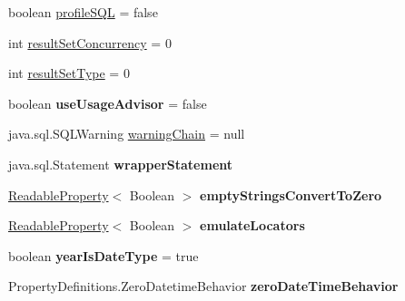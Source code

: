 \begin{DoxyCompactItemize}
\item 
boolean \mbox{\hyperlink{classcom_1_1mysql_1_1cj_1_1jdbc_1_1result_1_1_result_set_impl_a1c0f5f7e20e2f1dd39e0a46d918f60ba}{profile\+S\+QL}} = false
\item 
int \mbox{\hyperlink{classcom_1_1mysql_1_1cj_1_1jdbc_1_1result_1_1_result_set_impl_a66babb9ad9caeed50805a7903b02d39d}{result\+Set\+Concurrency}} = 0
\item 
int \mbox{\hyperlink{classcom_1_1mysql_1_1cj_1_1jdbc_1_1result_1_1_result_set_impl_af3d3012aaec246d4e0bdae8d3b4d0dc4}{result\+Set\+Type}} = 0
\item 
\mbox{\label{classcom_1_1mysql_1_1cj_1_1jdbc_1_1result_1_1_result_set_impl_a82d5de7f352a7095f5bde7d7e73661b3}} 
boolean {\bfseries use\+Usage\+Advisor} = false
\item 
java.\+sql.\+S\+Q\+L\+Warning \mbox{\hyperlink{classcom_1_1mysql_1_1cj_1_1jdbc_1_1result_1_1_result_set_impl_a5575179b551e7273df80ac0ee61870e1}{warning\+Chain}} = null
\item 
\mbox{\label{classcom_1_1mysql_1_1cj_1_1jdbc_1_1result_1_1_result_set_impl_a0f31d2bda94351b8afc869362a5b96d5}} 
java.\+sql.\+Statement {\bfseries wrapper\+Statement}
\item 
\mbox{\label{classcom_1_1mysql_1_1cj_1_1jdbc_1_1result_1_1_result_set_impl_a32fa2484e618e3ab4c2d406eb7f2e0d5}} 
\mbox{\hyperlink{interfacecom_1_1mysql_1_1cj_1_1conf_1_1_readable_property}{Readable\+Property}}$<$ Boolean $>$ {\bfseries empty\+Strings\+Convert\+To\+Zero}
\item 
\mbox{\label{classcom_1_1mysql_1_1cj_1_1jdbc_1_1result_1_1_result_set_impl_aa1b568155e4d8864ea8a793f70fdbdb1}} 
\mbox{\hyperlink{interfacecom_1_1mysql_1_1cj_1_1conf_1_1_readable_property}{Readable\+Property}}$<$ Boolean $>$ {\bfseries emulate\+Locators}
\item 
\mbox{\label{classcom_1_1mysql_1_1cj_1_1jdbc_1_1result_1_1_result_set_impl_a33a5646aa260799722a473c19278549e}} 
boolean {\bfseries year\+Is\+Date\+Type} = true
\item 
\mbox{\label{classcom_1_1mysql_1_1cj_1_1jdbc_1_1result_1_1_result_set_impl_ac5bad4f20493f69caf9781542f282fdb}} 
Property\+Definitions.\+Zero\+Datetime\+Behavior {\bfseries zero\+Date\+Time\+Behavior}
\end{DoxyCompactItemize}


